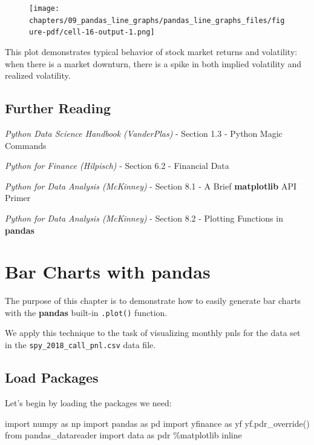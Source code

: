 \documentclass[
  letterpaper,
  DIV=11,
  numbers=noendperiod]{scrreprt}
\newenvironment{Shaded}{\begin{snugshade}}{\end{snugshade}}
\newcommand{\ImportTok}[1]{\textcolor[rgb]{0.00,0.46,0.62}{#1}}
\newcommand{\NormalTok}[1]{\textcolor[rgb]{0.00,0.23,0.31}{#1}}
\newcommand{\OperatorTok}[1]{\textcolor[rgb]{0.37,0.37,0.37}{#1}}
\begin{document}
\begin{figure}[H]

{\centering \texttt{[image: chapters/09\_pandas\_line\_graphs/pandas\_line\_graphs\_files/figure-pdf/cell-16-output-1.png]}

}

\end{figure}

This plot demonstrates typical behavior of stock market returns and
volatility: when there is a market downturn, there is a spike in both
implied volatility and realized volatility.

\hypertarget{further-reading-1}{%
\section{Further Reading}\label{further-reading-1}}

\emph{Python Data Science Handbook (VanderPlas)} - Section 1.3 - Python
Magic Commands

\emph{Python for Finance (Hilpisch)} - Section 6.2 - Financial Data

\emph{Python for Data Analysis (McKinney)} - Section 8.1 - A Brief
\textbf{matplotlib} API Primer

\emph{Python for Data Analysis (McKinney)} - Section 8.2 - Plotting
Functions in \textbf{pandas}

\hypertarget{bar-charts-with-pandas}{%
\chapter{\texorpdfstring{Bar Charts with
\textbf{pandas}}{Bar Charts with pandas}}\label{bar-charts-with-pandas}}

The purpose of this chapter is to demonstrate how to easily generate bar
charts with the \textbf{pandas} built-in \texttt{.plot()} function.

We apply this technique to the task of visualizing monthly pnls for the
data set in the \texttt{spy\_2018\_call\_pnl.csv} data file.

\hypertarget{load-packages-1}{%
\section{Load Packages}\label{load-packages-1}}

Let's begin by loading the packages we need:

\begin{Shaded}
\begin{Highlighting}[]
\ImportTok{import}\NormalTok{ numpy }\ImportTok{as}\NormalTok{ np}
\ImportTok{import}\NormalTok{ pandas }\ImportTok{as}\NormalTok{ pd}
\ImportTok{import}\NormalTok{ yfinance }\ImportTok{as}\NormalTok{ yf}
\NormalTok{yf.pdr\_override()}
\ImportTok{from}\NormalTok{ pandas\_datareader }\ImportTok{import}\NormalTok{ data }\ImportTok{as}\NormalTok{ pdr}
\OperatorTok{\%}\NormalTok{matplotlib inline}
\end{Highlighting}
\end{Shaded}
\end{document}
